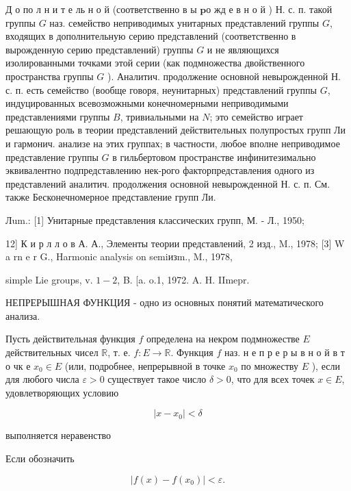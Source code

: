 \documentclass[10pt]{article}
\begin{document}
Д о по л н и т е ль н о й (соответственно в ы $\mathbf{p} о$ жд е в н о й ) Н. с. п. такой группы $G$ наз. семейство неприводимых унитарных представлений группы $G$, входящих в дополнительную серию представлений (соответственно в вырожденную серию представлений) группы $G$ и не являющихся изолированными точками этой серии (как подмножества двойственного пространства группы $G$ ). Аналитич. продолжение основной невырожденной Н. с. п. есть семейство (вообще говоря, неунитарных) представлений группы $G$, индуцированных всевозможными конечномерными неприводимыми представлениями группы $B$, тривиальными на $N$; это семейство играет решающую роль в теории представлений действительных полупростых групп Ли и гармонич. анализе на этих группах; в частности, любое вполне неприводимое представление группы $G$ в гильбертовом пространстве инфинитезимально эквивалентно подпредставлению нек-рого факторпредставления одного из представлений аналитич. продолжения основной невырожденной Н. с. п. См. также Бесконечномерное представление групп Ли.



Лum.: [1] Унитарные представления классических групп, М. - Л., 1950;

12] К и р л л о в А. А., Элементы теории представлений, 2 изд., M., 1978; [3] W a rn e r G., Harmonic analysis on semiизm., M., 1978,

simple Lie groups, v. $1-2$, B. [a. o.1, 1972. A. H. IImepr.



НЕПРЕРЫШНАЯ ФУНКЦИЯ - одно из основных понятий математического анализа.



Пусть действительная функция $f$ определена на некром подмножестве $E$ действительных чисел $\mathbb{R}$, т. е. $f: E \rightarrow \mathbb{R}$. Функция $f$ наз. н е п р е р ы в н о й в т о чк е $x_{0} \in E$ (или, подробнее, непрерывной в точке $x_{0}$ по множеству $E$ ), если для любого числа $\varepsilon>0$ существует такое число $\delta>0$, что для всех точек $x \in E$, удовлетворяющих условию



\[

\left|x-x_{0}\right|<\delta

\]



выполняется неравенство



Если обозначить



\[

\left|f(x)-f\left(x_{0}\right)\right|<\varepsilon .

\]
\end{document}
